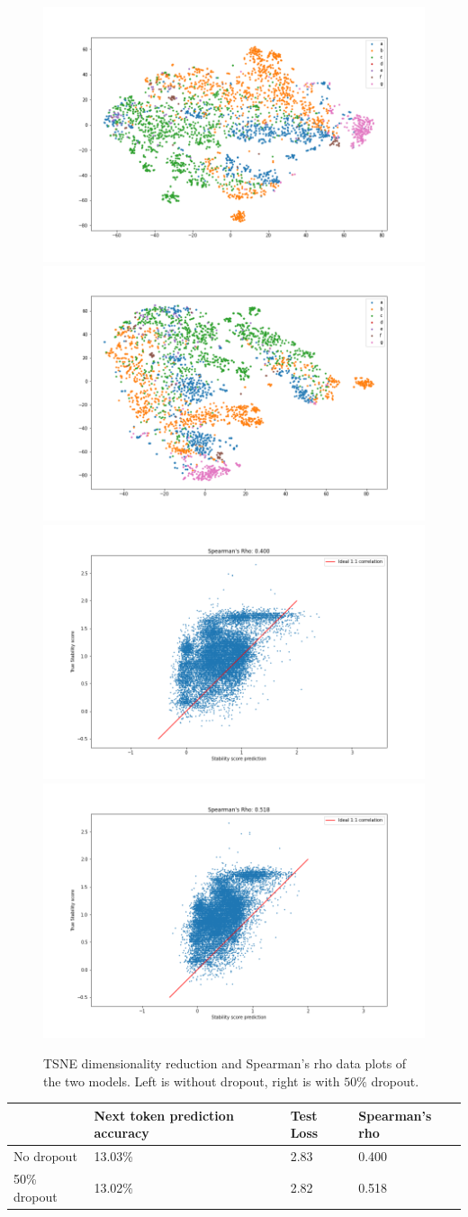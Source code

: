 \begin{figure}[!ht]
  \centering
  \includegraphics[width=0.49\linewidth]{latex/imgs/tsne_2_layer_no_drop_final.png}
  \includegraphics[width=0.49\linewidth]{latex/imgs/tsne_2_layer_05_drop_final.png}
  \includegraphics[width=0.49\linewidth]{latex/imgs/spearman_2_layer_no_drop_final.png}
  \includegraphics[width=0.49\linewidth]{latex/imgs/spearman_2_layer_05_drop_final.png}
  \caption{TSNE dimensionality reduction  and Spearman's rho data plots of the two models. Left is without dropout, right is with $50\%$ dropout.}
\end{figure}

\begin{table}[!ht]
\begin{tabular}{|l|l|l|l|}
\hline
             & Next token prediction accuracy & Test Loss & Spearman's rho\\ \hline
No dropout   & 13.03\%                        & 2.83      & 0.400         \\ \hline
50\% dropout & 13.02\%                        & 2.82      & 0.518         \\ \hline
\end{tabular}
\end{table}